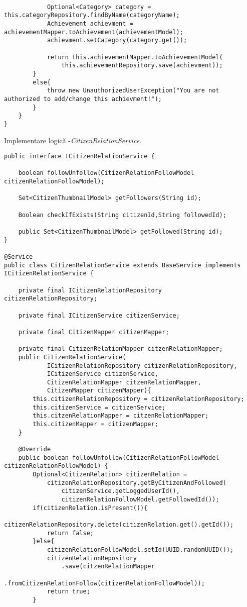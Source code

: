 \begin {lstlisting}
			
			Optional<Category> category = this.categoryRepository.findByName(categoryName);
			Achievement achievment = achievementMapper.toAchievement(achievementModel);
			achievment.setCategory(category.get());
			
			return this.achievementMapper.toAchievementModel(
                this.achievementRepository.save(achievment));
		}
		else{
			throw new UnauthorizedUserException("You are not authorized to add/change this achievment!");
		}
	}
}

\end{lstlisting}
Implementare logică -\textit{CitizenRelationService}.
\begin {lstlisting}
public interface ICitizenRelationService {

	boolean followUnfollow(CitizenRelationFollowModel citizenRelationFollowModel);

	Set<CitizenThumbnailModel> getFollowers(String id);
	
	Boolean checkIfExists(String citizenId,String followedId);
	
	public Set<CitizenThumbnailModel> getFollowed(String id);
}

@Service
public class CitizenRelationService extends BaseService implements ICitizenRelationService {

	private final ICitizenRelationRepository citizenRelationRepository;
	
	private final ICitizenService citizenService;
	
	private final CitizenMapper citizenMapper;
	
	private final CitizenRelationMapper citzenRelationMapper;
	public CitizenRelationService(
			ICitizenRelationRepository citizenRelationRepository, 
			ICitizenService citizenService,
			CitizenRelationMapper citzenRelationMapper,
			CitizenMapper citizenMapper){
		this.citizenRelationRepository = citizenRelationRepository;
		this.citizenService = citizenService;
		this.citzenRelationMapper = citzenRelationMapper;
		this.citizenMapper = citizenMapper;
	}
	
	@Override
	public boolean followUnfollow(CitizenRelationFollowModel citizenRelationFollowModel) {
		Optional<CitizenRelation> citizenRelation = 
            citizenRelationRepository.getByCitizenAndFollowed(
                citizenService.getLoggedUserId(),
                citizenRelationFollowModel.getFollowedId());
		if(citizenRelation.isPresent()){
			citizenRelationRepository.delete(citizenRelation.get().getId());
			return false;
		}else{
			citizenRelationFollowModel.setId(UUID.randomUUID());
			citizenRelationRepository
                .save(citzenRelationMapper
                .fromCitizenRelationFollow(citizenRelationFollowModel));
			return true;
		}


\end{lstlisting}
